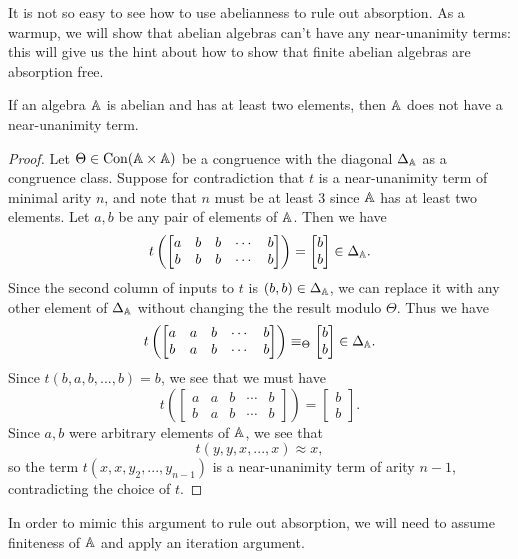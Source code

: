 \documentclass[letterpaper,11pt]{article}
\DeclareMathOperator{\Con}{Con}
\begin{document}
It is not so easy to see how to use abelianness to rule out absorption. As a warmup, we will show that abelian algebras can't have any near-unanimity terms: this will give us the hint about how to show that finite abelian algebras are absorption free.

\begin{prop} If an algebra $\mathbb{A}$ is abelian and has at least two elements, then $\mathbb{A}$ does not have a near-unanimity term.
\end{prop}
\begin{proof} Let $\Theta \in \Con(\bA \times \bA)$ be a congruence with the diagonal $\Delta_{\mathbb{A}}$ as a congruence class. Suppose for contradiction that $t$ is a near-unanimity term of minimal arity $n$, and note that $n$ must be at least $3$ since $\mathbb{A}$ has at least two elements. Let $a,b$ be any pair of elements of $\mathbb{A}$. Then we have
\[
t\left(\begin{bmatrix} a & b & b & \cdots & b\\ b & b & b & \cdots & b\end{bmatrix}\right) = \begin{bmatrix} b\\ b\end{bmatrix} \in \Delta_{\mathbb{A}}.
\]
Since the second column of inputs to $t$ is $(b,b) \in \Delta_{\mathbb{A}}$, we can replace it with any other element of $\Delta_{\mathbb{A}}$ without changing the the result modulo $\Theta$. Thus we have
\[
t\left(\begin{bmatrix} a & a & b & \cdots & b\\ b & a & b & \cdots & b\end{bmatrix}\right) \equiv_\Theta \begin{bmatrix} b\\ b\end{bmatrix} \in \Delta_{\mathbb{A}}.
\]
Since $t(b,a,b,...,b) = b$, we see that we must have
\[
t\left(\begin{bmatrix} a & a & b & \cdots & b\\ b & a & b & \cdots & b\end{bmatrix}\right) = \begin{bmatrix} b\\ b\end{bmatrix}.
\]
Since $a,b$ were arbitrary elements of $\mathbb{A}$, we see that
\[
t(y,y,x,...,x) \approx x,
\]
so the term $t(x,x,y_2,...,y_{n-1})$ is a near-unanimity term of arity $n-1$, contradicting the choice of $t$.
\end{proof}

In order to mimic this argument to rule out absorption, we will need to assume finiteness of $\mathbb{A}$ and apply an iteration argument.
\end{document}
